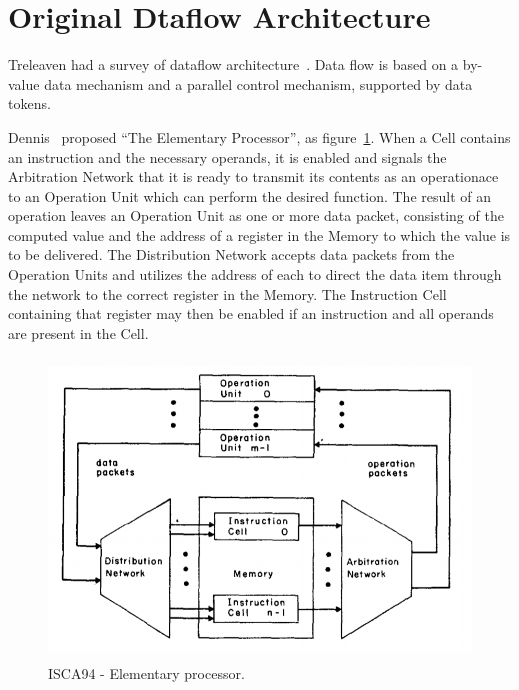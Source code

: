 \documentclass[UTF8,12pt,a4paper]{article}
\begin{document}
\clearpage

\section{Original Dtaflow Architecture}
Treleaven had a survey of dataflow architecture~\cite{DBLP:journals/csur/TreleavenBH82}.
Data flow is based on a by-value data mechanism
and a parallel control mechanism, supported by data tokens. 

Dennis~\cite{DBLP:conf/isca/DennisM74} proposed ``The Elementary Processor'',
as figure~\ref{fig:elementory_processor}.
When a Cell contains an instruction and the necessary operands,
it is enabled and signals the Arbitration Network
that it is ready to transmit its contents as an operationace
to an Operation Unit which can perform the desired function.
The result of an operation leaves an Operation Unit
as one or more data packet,
consisting of the computed value and the address of a register
in the Memory to which the value is to be delivered.
The Distribution Network accepts data packets
from the Operation Units and utilizes the address of each
to direct the data item through the network to the correct register in the Memory.
The Instruction Cell containing that register may then be enabled
if an instruction and all operands are present in the Cell.

\begin{figure}[htb]
  \begin{small}
    \begin{center}
      \includegraphics[width=\textwidth,height=8cm]{figures/isca94_elementory_processor.png}
    \end{center}
    \caption{ISCA94 - Elementary processor.}
    \label{fig:elementory_processor}
  \end{small}
\end{figure}
\end{document}
